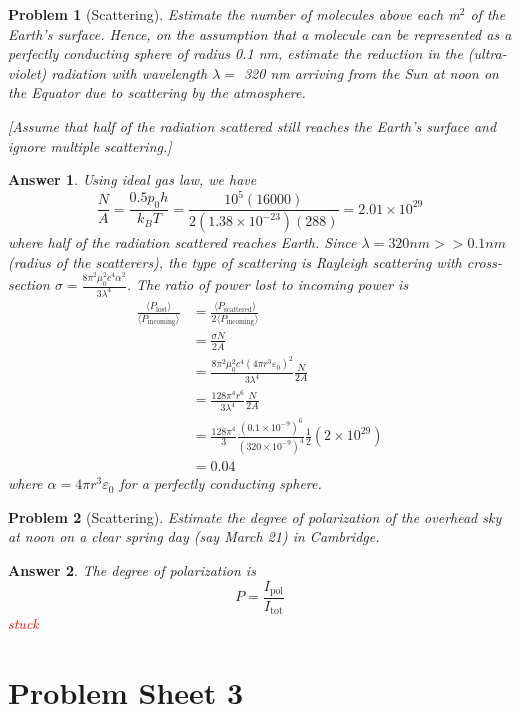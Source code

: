 \documentclass[a4paper]{article}
\newtheorem{ans}{Answer}
\theoremstyle{new}
\newtheorem{qns}{Problem}
\begin{document}
\newpage
\begin{qns}[Scattering]
Estimate the number of molecules above each m$^2$ of the Earth’s surface. Hence, on the assumption that a molecule can be represented as a perfectly conducting sphere of radius 0.1 nm, estimate the reduction in the (ultra-violet) radiation with wavelength $\lambda=$ 320 nm arriving from the Sun at noon on the Equator due to scattering by the atmosphere.

[Assume that half of the radiation scattered still reaches the Earth’s surface and ignore multiple scattering.]
\end{qns}
\begin{ans}
Using ideal gas law, we have
$$\frac{N}{A}=\frac{0.5p_0h}{k_BT}=\frac{10^5(16000)}{2(1.38\times10^{-23})(288)}=2.01\times10^{29}$$
where half of the radiation scattered reaches Earth. Since $\lambda=320 nm>>0.1 nm$ (radius of the scatterers), the type of scattering is Rayleigh scattering with cross-section $\sigma=\frac{8\pi^2\mu_0^2c^4\alpha^2}{3\lambda^4}$. The ratio of power lost to incoming power is
\begin{align}
    \frac{\langle P_{\text{lost}}\rangle}{\langle P_{\text{incoming}}\rangle}&=\frac{\langle P_{\text{scattered}}\rangle}{2\langle P_{\text{incoming}}\rangle}\nonumber\\&=\frac{\sigma N}{2A}\nonumber\\&=\frac{8\pi^2\mu_0^2c^4(4\pi r^3\varepsilon_0)^2}{3\lambda^4}\frac{N}{2A}\nonumber\\&=\frac{128\pi^4r^6}{3\lambda^4}\frac{N}{2A}\nonumber\\&=\frac{128\pi^4}{3}\frac{(0.1\times10^{-9})^6}{(320\times10^{-9})^4}\frac{1}{2}(2\times10^{29})\nonumber\\&=0.04\nonumber
\end{align}
where $\alpha=4\pi r^3\varepsilon_0$ for a perfectly conducting sphere.
\end{ans}
\begin{qns}[Scattering]
Estimate the degree of polarization of the overhead sky at noon on a clear spring day (say March 21) in Cambridge.
\end{qns}
\begin{ans}
The degree of polarization is
$$P=\frac{I_{\text{pol}}}{I_{\text{tot}}}$$
\textcolor{red}{stuck}
\end{ans}
\newpage
\section{Problem Sheet 3}
\end{document}
